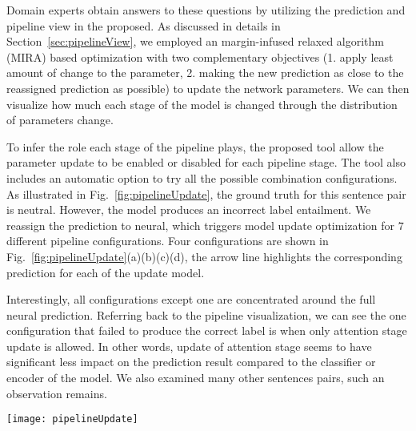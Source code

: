 Domain experts obtain answers to these questions by utilizing the prediction and pipeline view in the proposed. As discussed in details in Section~\ref{sec:pipelineView}, we employed an margin-infused relaxed algorithm (MIRA) based optimization with two complementary objectives (1. apply least amount of change to the parameter, 2. making the new prediction as close to the reassigned prediction as possible) to update the network parameters.
%
We can then visualize how much each stage of the model is changed through the distribution of parameters change.

To infer the role each stage of the pipeline plays, the proposed tool allow the parameter update to be enabled or disabled for each pipeline stage.
The tool also includes an automatic option to try all the possible combination configurations. As illustrated in Fig.~\ref{fig:pipelineUpdate}, the ground truth for this sentence pair is neutral. However, the model produces an incorrect label entailment. We reassign the prediction to neural, which triggers model update optimization for $7$ different pipeline configurations. Four configurations are shown in Fig.~\ref{fig:pipelineUpdate}(a)(b)(c)(d), the arrow line highlights the corresponding prediction for each of the update model.

Interestingly, all configurations except one are concentrated around the full neural prediction. Referring back to the pipeline visualization, we can see the one configuration that failed to produce the correct label is when only attention stage update is allowed.
%
In other words, update of attention stage seems to have significant less impact on the prediction result compared to the classifier or encoder of the model.
We also examined many other sentences pairs, such an observation remains.

%



\begin{figure*}[t]
\centering
\vspace{-2mm}
 \texttt{[image: pipelineUpdate]}
 \caption{
How changes in different stage impact the prediction.
 }
\label{fig:pipelineUpdate}
\end{figure*}

